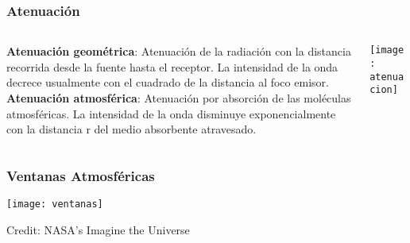\documentclass[]{beamer}
\begin{document}
\begin{frame}
\frametitle{Atenuación}
  \begin{columns}
		\begin{column}{.4\linewidth}
		 \scriptsize{\textbf{Atenuación geométrica}: Atenuación de la radiación con la distancia recorrida desde la fuente hasta el receptor. La intensidad de la onda decrece usualmente con el cuadrado de la distancia al foco emisor.\\
\vspace{5pt}
\textbf{Atenuación atmosférica}: Atenuación por absorción de las moléculas atmosféricas. La intensidad de la onda disminuye exponencialmente con la distancia r del medio absorbente atravesado.}
		\end{column}
		\begin{column}{.6\linewidth}
			 \texttt{[image: atenuacion]}
		\end{column}
	\end{columns}
\end{frame}
\begin{frame}
\frametitle{Ventanas Atmosféricas}
\begin{center} 
\texttt{[image: ventanas]}
\end{center}
\tiny{Credit: NASA's Imagine the Universe}
\end{frame}
\end{document}
